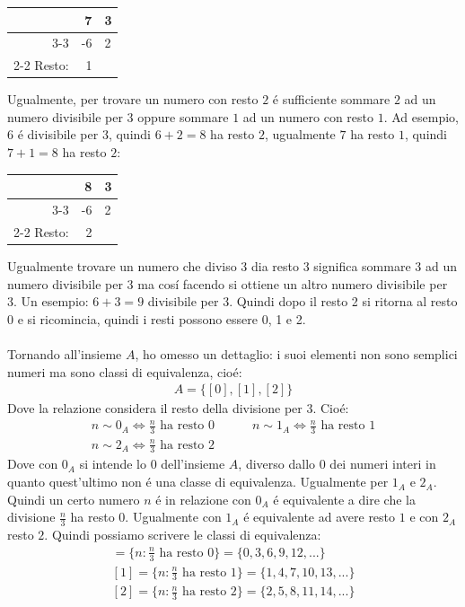 \documentclass[twoside]{article} %
\begin{document}
	\begin{center}	
		\begin{tabular}{rr|l}
			&7&3\\\cline{3-3}
			&-6&2\\\cline{2-2}
			Resto:&1&
		\end{tabular}
	\end{center}
	Ugualmente, per trovare un numero con resto $2$ \'e sufficiente sommare $2$ ad un numero divisibile per $3$ oppure sommare $1$ ad un numero con resto $1$. Ad esempio, $6$ \'e divisibile per $3$, quindi $6+2=8$ ha resto $2$, ugualmente $7$ ha resto $1$, quindi $7+1=8$ ha resto $2$:
	\begin{center}	
		\begin{tabular}{rr|l}
			&8&3\\\cline{3-3}
			&-6&2\\\cline{2-2}
			Resto:&2&
		\end{tabular}
	\end{center}
	Ugualmente trovare un numero che diviso 3 dia resto 3 significa sommare 3 ad un numero divisibile per 3 ma cos\'i facendo si ottiene un altro numero divisibile per 3. Un esempio: $6+3=9$ divisibile per $3$. Quindi dopo il resto 2 si ritorna al resto 0 e si ricomincia, quindi i resti possono essere 0, 1 e 2.\\\\
	Tornando all'insieme $A$, ho omesso un dettaglio: i suoi elementi non sono semplici numeri ma sono classi di equivalenza, cio\'e:
	\begin{gather*}
		A=\{[0], [1], [2]\}
	\end{gather*} 
	Dove la relazione considera il resto della divisione per $3$. Cio\'e:
	\begin{gather*}
		n\sim 0_A\Leftrightarrow \frac{n}{3} \text{ ha resto 0}\qquad\quad
		n\sim 1_A\Leftrightarrow \frac{n}{3} \text{ ha resto 1}\\
		n\sim 2_A\Leftrightarrow \frac{n}{3} \text{ ha resto 2}
	\end{gather*}
	Dove con $0_A$ si intende lo $0$ dell'insieme $A$, diverso dallo $0$ dei numeri interi in quanto quest'ultimo non \'e una classe di equivalenza. Ugualmente per $1_A$ e $2_A$. Quindi un certo numero $n$ \'e in relazione con $0_A$ \'e equivalente a dire che la divisione $\frac{n}{3}$ ha resto 0. Ugualmente con $1_A$ \'e equivalente ad avere resto $1$ e con $2_A$ resto $2$. Quindi possiamo scrivere le classi di equivalenza:
	\begin{gather*}
		[0]=\{n: \frac{n}{3} \text{ ha resto }0\}=\{0,3,6,9,12,...\}\\
		[1]=\{n: \frac{n}{3} \text{ ha resto }1\}=\{1,4,7,10,13,...\}\\
		[2]=\{n: \frac{n}{3} \text{ ha resto }2\}=\{2,5,8,11,14,...\}
	\end{gather*}
\end{document}
